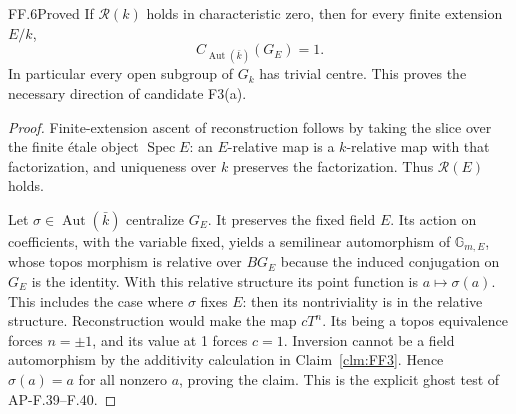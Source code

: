 \begin{claim}{FF.6}{Proved}\label{clm:FF6}
If \(\mathcal R(k)\) holds in characteristic zero, then for every
finite extension \(E/k\),
\[
             C_{\operatorname{Aut}(\bar k)}(G_E)=1.
\]
In particular every open subgroup of \(G_k\) has trivial centre.
This proves the necessary direction of candidate F3(a).
\end{claim}
\begin{proof}
Finite-extension ascent of reconstruction follows by taking the
slice over the finite \'etale object \(\operatorname{Spec}E\):
an \(E\)-relative map is a \(k\)-relative map with that factorization,
and uniqueness over \(k\) preserves the factorization. Thus
\(\mathcal R(E)\) holds.

Let \(\sigma\in\operatorname{Aut}(\bar k)\) centralize \(G_E\).
It preserves the fixed field \(E\). Its action on coefficients,
with the variable fixed, yields a semilinear automorphism of
\(\mathbb G_{m,E}\), whose topos morphism is relative over
\(BG_E\) because the induced conjugation on \(G_E\) is the
identity. With this relative structure its point function is
\(a\mapsto\sigma(a)\). This includes the case where \(\sigma\)
fixes \(E\): then its nontriviality is in the relative structure.
Reconstruction would make the map \(cT^n\). Its being a topos
equivalence forces \(n=\pm1\), and its value at 1 forces \(c=1\).
Inversion cannot be a field automorphism by the additivity calculation
in Claim~\ref{clm:FF3}. Hence \(\sigma(a)=a\) for all nonzero
\(a\), proving the claim. This is the explicit ghost test of
AP-F.39--F.40.
\end{proof}

